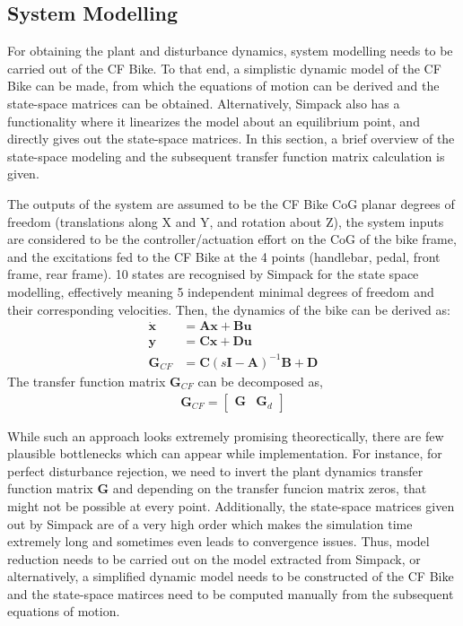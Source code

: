 \subsection*{System Modelling}
For obtaining the plant and disturbance dynamics, system modelling needs to be carried out of the CF Bike. To that end, a simplistic dynamic model of the CF Bike can be made, from which the equations of motion can be derived and the state-space matrices can be obtained. Alternatively, Simpack also has a functionality where it linearizes the model about an equilibrium point, and directly gives out the state-space matrices. In this section, a brief overview of the state-space modeling and the subsequent transfer function matrix calculation is given.

The outputs of the system are assumed to be the CF Bike CoG planar degrees of freedom (translations along X and Y, and rotation about Z), the system inputs are considered to be the controller/actuation effort on the CoG of the bike frame, and the excitations fed to the CF Bike at the 4 points (handlebar, pedal, front frame, rear frame). 10 states are recognised by Simpack for the state space modelling, effectively meaning 5 independent minimal degrees of freedom and their corresponding velocities. Then, the dynamics of the bike can be derived as:
\begin{align*}
	\dot{\bm{x}} &= \bm{Ax} + \bm{Bu}\\
	\bm{y} &= \bm{Cx} + \bm{Du}\\
	\bm{G}_{CF} &= \bm{C}(s\bm{I} - \bm{A})^{-1}\bm{B} + \bm{D}
\end{align*}
The transfer function matrix $\mathbf{G}_{CF}$ can be decomposed as,
\begin{align*}
	\bm{G}_{CF} = \begin{bmatrix}
		\bm{G}&\bm{G}_d
	\end{bmatrix}
\end{align*}
 
 While such an approach looks extremely promising theorectically, there are few plausible bottlenecks which can appear while implementation. For instance, for perfect disturbance rejection, we need to invert the plant dynamics transfer function matrix $\mathbf{G}$ and depending on the transfer funcion matrix zeros, that might not be possible at every point. Additionally, the state-space matrices given out by Simpack are of a very high order which makes the simulation time extremely long and sometimes even leads to convergence issues. Thus, model reduction needs to be carried out on the model extracted from Simpack, or alternatively, a simplified dynamic model needs to be constructed of the CF Bike and the state-space matirces need to be computed manually from the subsequent equations of motion.
 
